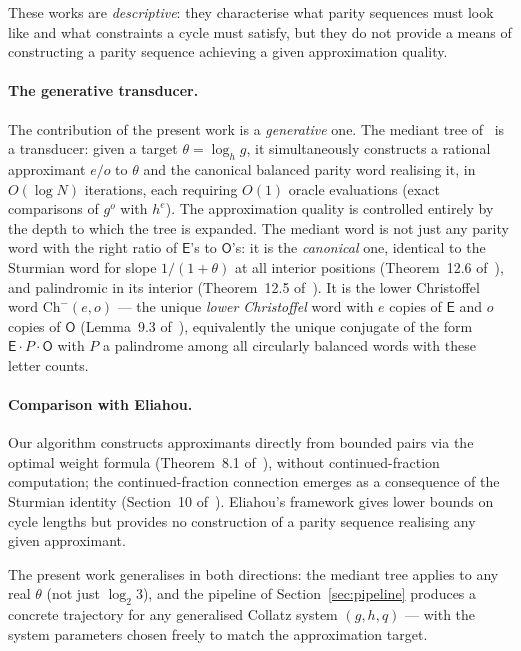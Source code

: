 \documentclass[12pt]{article}
\theoremstyle{definition}
\theoremstyle{remark}
\theoremstyle{plain}
\newcommand{\OO}{\mathsf{O}}
\newcommand{\EE}{\mathsf{E}}
\begin{document}
These works are \emph{descriptive}: they characterise what parity sequences must look
like and what constraints a cycle must satisfy, but they do not provide a means of
constructing a parity sequence achieving a given approximation quality.

\paragraph{The generative transducer.}
The contribution of the present work is a \emph{generative} one.
The mediant tree of~\cite{paper76} is a transducer: given a target $\theta = \log_h g$,
it simultaneously constructs a rational approximant $e/o$ to $\theta$ and the canonical
balanced parity word realising it, in $O(\log N)$ iterations, each requiring $O(1)$
oracle evaluations (exact comparisons of $g^o$ with $h^e$).
The approximation quality is controlled entirely by the depth to which the tree is expanded.
The mediant word is not just any parity word with the right ratio of $\EE$'s to
$\OO$'s: it is the \emph{canonical} one, identical to the Sturmian word for slope
$1/(1+\theta)$ at all interior positions (Theorem~12.6 of~\cite{paper76}), and
palindromic in its interior (Theorem~12.5 of~\cite{paper76}).
It is the lower Christoffel word $\mathrm{Ch}^-(e, o)$ --- the unique
\emph{lower Christoffel} word with $e$ copies of $\EE$ and $o$ copies of $\OO$
(Lemma~9.3 of~\cite{paper76}), equivalently the unique conjugate of the form
$\EE \cdot P \cdot \OO$ with $P$ a palindrome among all circularly balanced words
with these letter counts.

\paragraph{Comparison with Eliahou.}
Our algorithm constructs approximants directly from bounded pairs via the optimal weight
formula (Theorem~8.1 of~\cite{paper76}), without continued-fraction computation; the
continued-fraction connection emerges as a consequence of the Sturmian identity
(Section~10 of~\cite{paper76}).
Eliahou's framework gives lower bounds on cycle lengths but provides no construction
of a parity sequence realising any given approximant.

The present work generalises in both directions: the mediant tree applies to any real
$\theta$ (not just $\log_2 3$), and the pipeline of Section~\ref{sec:pipeline} produces
a concrete trajectory for any generalised Collatz system $(g, h, q)$ --- with the system
parameters chosen freely to match the approximation target.
\end{document}
